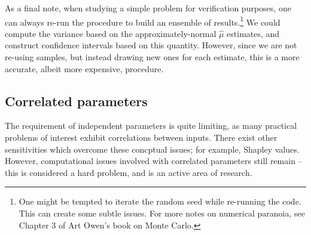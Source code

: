 \documentclass[../primer.tex]{subfiles}
\begin{document}
As a final note, when studying a simple problem for verification purposes, one
can always re-run the procedure to build an ensemble of results.\footnote{One might
be tempted to iterate the random seed while re-running the code. This can create
some subtle issues. For more notes on numerical paranoia, see Chapter 3 of Art
Owen's book on Monte Carlo.\cite{owen2013montecarlo}} We could compute the
variance based on the approximately-normal \(\hat{\mu}\) estimates, and construct
confidence intervals based on this quantity. However, since we are not re-using
samples, but instead drawing new ones for each estimate, this is a more
accurate, albeit more expensive, procedure.

\subsection{Correlated parameters}
\label{sec:org718c51b}
The requirement of independent parameters is quite limiting, as many practical
problems of interest exhibit correlations between inputs. There exist other
sensitivities which overcome these concptual issues; for example, Shapley
values. \cite{owen2017shapley} However, computational issues involved with
correlated parameters still remain -- this is considered a hard problem, and is
an active area of research.
\end{document}
